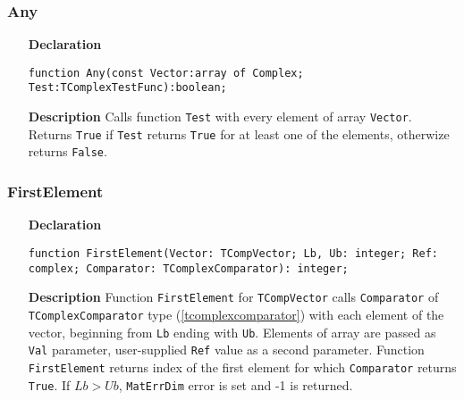 \documentclass[12pt,a4paper,oneside]{report}
\newcommand{\declarationitem}[1]{\textbf{#1}}
\newcommand{\descriptiontitle}[1]{\textbf{#1}}
\newcommand{\code}[1]{\texttt{#1}}
\begin{document}
\subsubsection{Any}
\label{comp-any}
\begin{itemize}
	\item[\declarationitem{Declaration}\hfill]
	\begin{flushleft}
\code{function Any(const Vector:array of Complex; Test:TComplexTestFunc):boolean;}		
	\end{flushleft}
	\item[\descriptiontitle{Description}]
	Calls function \code{Test} with every element of array \code{Vector}. Returns \code{True} if \code{Test} returns \code{True} for at least one of the elements, otherwize returns \code{False}.
\end{itemize}	
\subsubsection{FirstElement}
\label{comp-firstelement}
\begin{itemize}
	\item[\declarationitem{Declaration}\hfill]
	\begin{flushleft}
\code{function FirstElement(Vector: TCompVector; Lb, Ub: integer; Ref: complex; Comparator: TComplexComparator): integer;}		
	\end{flushleft}
	\item[\descriptiontitle{Description}]
	Function \code{FirstElement} for \code{TCompVector} calls \code{Comparator} of \code{TComplexComparator} type (\ref{tcomplexcomparator}) with each element of the vector, beginning from \code{Lb} ending with \code{Ub}. Elements of array are passed as \code{Val} parameter, user-supplied \code{Ref} value as a second parameter. Function \code{FirstElement} returns index of the first element for which \code{Comparator} returns \code{True}.  If $Lb > Ub$, \code{MatErrDim} error is set and -1 is returned.  
\end{itemize}	
\end{document}
